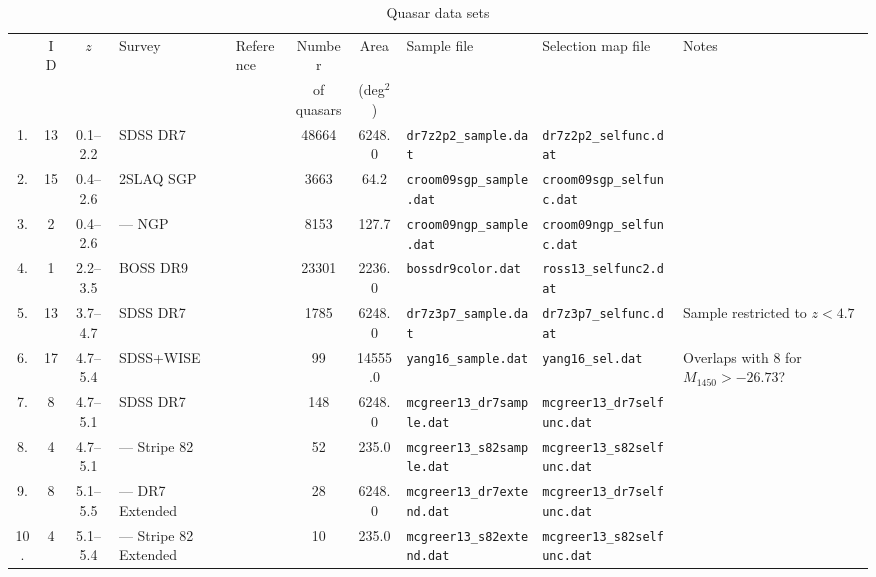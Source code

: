 \documentclass[a4paper,fleqn,usenatbib]{mnras}
\begin{document}
\begin{landscape}
  \begin{table}
    \caption{Quasar data sets}
    \label{tab:samples}
    \begin{tabular}{cccllcclll}
      \hline
      & ID & $z$ & Survey & Reference & Number & Area & Sample file & Selection map file & Notes \\
      & & & & & of quasars & (deg$^2$) & & & \\
      \hline
      1. & 13 & 0.1--2.2 & SDSS DR7 & \citet{2006AJ....131.2766R} & 48664 & 6248.0 & \texttt{dr7z2p2\_sample.dat} & \texttt{dr7z2p2\_selfunc.dat} &  \\
      2. & 15 & 0.4--2.6 & 2SLAQ SGP & \citet{2009MNRAS.392...19C} & 3663 & 64.2 & \texttt{croom09sgp\_sample.dat} & \texttt{croom09sgp\_selfunc.dat} & \\ 
      3. &  2 & 0.4--2.6 & --- NGP & \citet{2009MNRAS.392...19C} & 8153 & 127.7 & \texttt{croom09ngp\_sample.dat} & \texttt{croom09ngp\_selfunc.dat} & \\
      4. &  1 & 2.2--3.5 & BOSS DR9 & \citet{2013ApJ...773...14R} & 23301 & 2236.0 & \texttt{bossdr9color.dat} & \texttt{ross13\_selfunc2.dat} & \\
      5. & 13 & 3.7--4.7 & SDSS DR7 & \citet{2006AJ....131.2766R} & 1785 & 6248.0 & \texttt{dr7z3p7\_sample.dat} & \texttt{dr7z3p7\_selfunc.dat} & Sample restricted to $z<4.7$ \\
      6. & 17 & 4.7--5.4 & SDSS+WISE & \citet{2016ApJ...829...33Y} & 99 & 14555.0 & \texttt{yang16\_sample.dat} & \texttt{yang16\_sel.dat} & Overlaps with 8 for $M_{1450}>-26.73$? \\
      7. &  8 & 4.7--5.1 & SDSS DR7 & \citet{2013ApJ...768..105M} & 148 & 6248.0 & \texttt{mcgreer13\_dr7sample.dat} & \texttt{mcgreer13\_dr7selfunc.dat} & \\
      8. &  4 & 4.7--5.1 & --- Stripe 82 & \citet{2013ApJ...768..105M} & 52 & 235.0 & \texttt{mcgreer13\_s82sample.dat} & \texttt{mcgreer13\_s82selfunc.dat} & \\
      9. &  8 & 5.1--5.5 & --- DR7 Extended & \citet{2013ApJ...768..105M} & 28 & 6248.0 & \texttt{mcgreer13\_dr7extend.dat} & \texttt{mcgreer13\_dr7selfunc.dat} & \\
      10. & 4 & 5.1--5.4 & ---  Stripe 82 Extended & \citet{2013ApJ...768..105M} & 10 & 235.0 & \texttt{mcgreer13\_s82extend.dat} & \texttt{mcgreer13\_s82selfunc.dat} & \\

\end{tabular}
\end{table}
\end{landscape}
\end{document}
